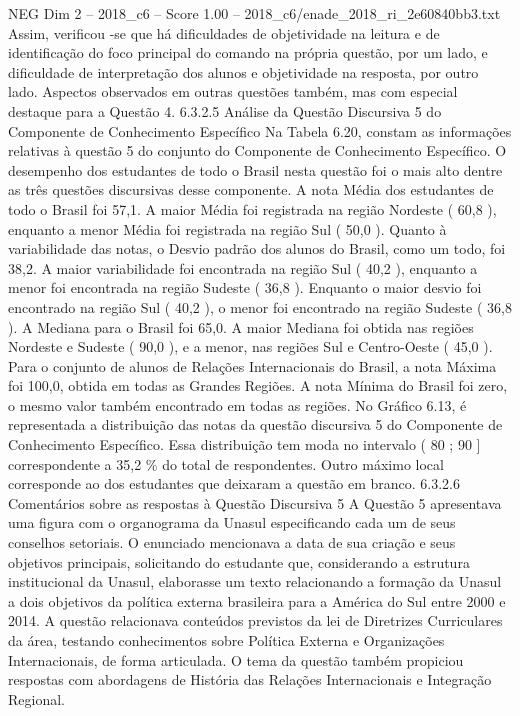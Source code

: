 \begin{textsample}{NEG Dim 2 – 2018\_c6 – Score 1.00 – 2018\_c6/enade\_2018\_ri\_2e60840bb3.txt}
Assim, verificou -se que há dificuldades de objetividade na leitura e de identificação do foco principal do comando na própria questão, por um lado, e dificuldade de interpretação dos alunos e objetividade na resposta, por outro lado.
Aspectos observados em outras questões também, mas com especial destaque para a Questão 4. 6.3.2.5 Análise da Questão Discursiva 5 do Componente de Conhecimento Específico Na Tabela 6.20, constam as informações relativas à questão 5 do conjunto do Componente de Conhecimento Específico.
O desempenho dos estudantes de todo o Brasil nesta questão foi o mais alto dentre as três questões discursivas desse componente.
A nota Média dos estudantes de todo o Brasil foi 57,1.
A maior Média foi registrada na região Nordeste ( 60,8 ), enquanto a menor Média foi registrada na região Sul ( 50,0 ).
Quanto à variabilidade das notas, o Desvio padrão dos alunos do Brasil, como um todo, foi 38,2.
A maior variabilidade foi encontrada na região Sul ( 40,2 ), enquanto a menor foi encontrada na região Sudeste ( 36,8 ).
Enquanto o maior desvio foi encontrado na região Sul ( 40,2 ), o menor foi encontrado na região Sudeste ( 36,8 ).
A Mediana para o Brasil foi 65,0.
A maior Mediana foi obtida nas regiões Nordeste e Sudeste ( 90,0 ), e a menor, nas regiões Sul e Centro-Oeste ( 45,0 ).
Para o conjunto de alunos de Relações Internacionais do Brasil, a nota Máxima foi 100,0, obtida em todas as Grandes Regiões.
A nota Mínima do Brasil foi zero, o mesmo valor também encontrado em todas as regiões.
No Gráfico 6.13, é representada a distribuição das notas da questão discursiva 5 do Componente de Conhecimento Específico.
Essa distribuição tem moda no intervalo ( 80 ; 90 ] correspondente a 35,2 \% do total de respondentes.
Outro máximo local corresponde ao dos estudantes que deixaram a questão em branco. 6.3.2.6 Comentários sobre as respostas à Questão Discursiva 5 A Questão 5 apresentava uma figura com o organograma da Unasul especificando cada um de seus conselhos setoriais.
O enunciado mencionava a data de sua criação e seus objetivos principais, solicitando do estudante que, considerando a estrutura institucional da Unasul, elaborasse um texto relacionando a formação da Unasul a dois objetivos da política externa brasileira para a América do Sul entre 2000 e 2014.
A questão relacionava conteúdos previstos da lei de Diretrizes Curriculares da área, testando conhecimentos sobre Política Externa e Organizações Internacionais, de forma articulada.
O tema da questão também propiciou respostas com abordagens de História das Relações Internacionais e Integração Regional.

\end{textsample}
